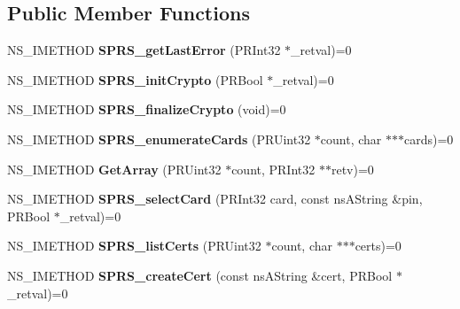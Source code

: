 \subsection*{Public Member Functions}
\begin{DoxyCompactItemize}
\item 
\hypertarget{classnsISPRS__PKCS11__Wrapper_a8b61744812237ba63b1d6078a7140850}{
NS\_\-IMETHOD {\bfseries SPRS\_\-getLastError} (PRInt32 $\ast$\_\-retval)=0}
\label{classnsISPRS__PKCS11__Wrapper_a8b61744812237ba63b1d6078a7140850}

\item 
\hypertarget{classnsISPRS__PKCS11__Wrapper_add3cdf2b5b2bb0fe00e0f0b881185043}{
NS\_\-IMETHOD {\bfseries SPRS\_\-initCrypto} (PRBool $\ast$\_\-retval)=0}
\label{classnsISPRS__PKCS11__Wrapper_add3cdf2b5b2bb0fe00e0f0b881185043}

\item 
\hypertarget{classnsISPRS__PKCS11__Wrapper_a7f251f3a01110110ba3ed2efefc4f09f}{
NS\_\-IMETHOD {\bfseries SPRS\_\-finalizeCrypto} (void)=0}
\label{classnsISPRS__PKCS11__Wrapper_a7f251f3a01110110ba3ed2efefc4f09f}

\item 
\hypertarget{classnsISPRS__PKCS11__Wrapper_a25acd085528efa457da74b5d7a5d7939}{
NS\_\-IMETHOD {\bfseries SPRS\_\-enumerateCards} (PRUint32 $\ast$count, char $\ast$$\ast$$\ast$cards)=0}
\label{classnsISPRS__PKCS11__Wrapper_a25acd085528efa457da74b5d7a5d7939}

\item 
\hypertarget{classnsISPRS__PKCS11__Wrapper_a48e756de78fe5eb3542704505d62a543}{
NS\_\-IMETHOD {\bfseries GetArray} (PRUint32 $\ast$count, PRInt32 $\ast$$\ast$retv)=0}
\label{classnsISPRS__PKCS11__Wrapper_a48e756de78fe5eb3542704505d62a543}

\item 
\hypertarget{classnsISPRS__PKCS11__Wrapper_ac9a82527bf2c835839532302b64d3ada}{
NS\_\-IMETHOD {\bfseries SPRS\_\-selectCard} (PRInt32 card, const nsAString \&pin, PRBool $\ast$\_\-retval)=0}
\label{classnsISPRS__PKCS11__Wrapper_ac9a82527bf2c835839532302b64d3ada}

\item 
\hypertarget{classnsISPRS__PKCS11__Wrapper_a9817e5d58cb533d81e4bcf129d05cccb}{
NS\_\-IMETHOD {\bfseries SPRS\_\-listCerts} (PRUint32 $\ast$count, char $\ast$$\ast$$\ast$certs)=0}
\label{classnsISPRS__PKCS11__Wrapper_a9817e5d58cb533d81e4bcf129d05cccb}

\item 
\hypertarget{classnsISPRS__PKCS11__Wrapper_a985c8fdb86adba1b1c5f1bf33240d43a}{
NS\_\-IMETHOD {\bfseries SPRS\_\-createCert} (const nsAString \&cert, PRBool $\ast$\_\-retval)=0}
\label{classnsISPRS__PKCS11__Wrapper_a985c8fdb86adba1b1c5f1bf33240d43a}


\end{DoxyCompactItemize}
